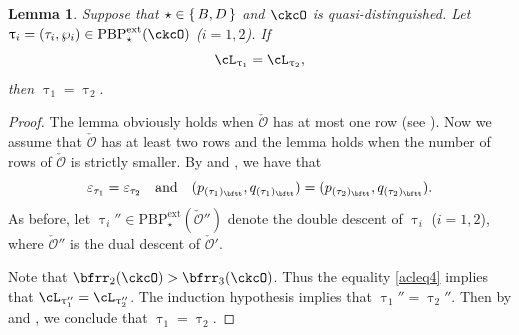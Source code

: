 \documentclass[11pt,a4paper]{amsart}
\newcommand{\CO}{{\mathcal {O}}}
\newcommand{\be}{\begin {equation}}
\newcommand{\ee}{\end {equation}}
\numberwithin{equation}{section}
\newtheorem{lem}[thm]{Lemma}
\theoremstyle{remark}
\def\PBPe{\mathrm{PBP}^{\mathrm{ext}}}
\def\PBPes{\mathrm{PBP}^{\mathrm{ext}}_{\star}}
\def\AND{\quad\text{and}\quad}
\def\ac{\cL}
\begin{document}
\begin{lem}\label{lem:BD2222}
Suppose that $\star \in \set{B,D}$ and 
$\ckcO$ is quasi-distinguished. Let $\uptau_i=(\tau_i, \wp_i)\in \PBPe_\star(\ckcO)$ 
  ($i=1,2$). If
  \be\label{acleq4}
    \ac_{\uptau_1}= \ac_{\uptau_2},
  \ee
  then
  $
  \uptau_{1}=\uptau_{2}.
  $
\end{lem}
\begin{proof}
The lemma obviously holds when $\check \CO$ has at most one row (see ).  Now we assume that $\check \CO$ has at least two rows and the lemma holds when the number of rows of $\check \CO$ is strictly smaller. 
By  and  ,  we have that 
  \[
   \varepsilon_{\tau_1}=\varepsilon_{\tau_2} \AND  (p_{(\tau_1)_\bftt}, q_{(\tau_1)_\bftt}) =(p_{(\tau_2)_\bftt}, q_{(\tau_2)_\bftt}).
  \]
As before, let  $\uptau_i''\in \PBPes(\check \CO'')$ denote the double descent of $\uptau_i$ ($i=1,2$), where $\check \CO''$ is the dual descent of $\check \CO'$.   

Note that $\bfrr_2(\ckcO)>\bfrr_3(\ckcO)$. Thus the equality \eqref{acleq4} implies that
$\ac_{\uptau_1''}=\ac_{\uptau_2''}$. 
The induction hypothesis implies that $\uptau_1''=\uptau_2''$. Then by  and , we conclude that $\uptau_1=\uptau_2$.
\end{proof}
\end{document}
